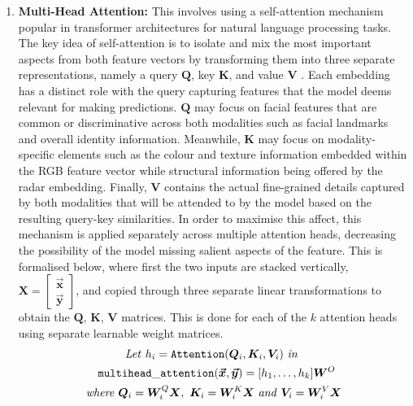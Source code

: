 \documentclass{mpaper}
\begin{document}
\begin{enumerate}
    \item \textbf{Multi-Head Attention:} This involves using a self-attention mechanism popular in transformer architectures for natural language processing tasks. The key idea of self-attention is to isolate and mix the most important aspects from both feature vectors by transforming them into three separate representations, namely a query $\bm{Q}$, key $\bm{K}$, and value $\bm{V}$ \cite{vaswani2017attention}. Each embedding has a distinct role with the query capturing features that the model deems relevant for making predictions. $\bm{Q}$ may focus on facial features that are common or discriminative across both modalities such as facial landmarks and overall identity information. Meanwhile, $\bm{K}$ may focus on modality-specific elements such as the colour and texture information embedded within the RGB feature vector while structural information being offered by the radar embedding. Finally, $\bm{V}$ contains the actual fine-grained details captured by both modalities that will be attended to by the model based on the resulting query-key similarities. In order to maximise this affect, this mechanism is applied separately across multiple attention heads, decreasing the possibility of the model missing salient aspects of the feature.
    This is formalised below, where first the two inputs are stacked vertically, $\bm{X} = \begin{bmatrix} \bm{\vec{x}} \\ \bm{\vec{y}} \end{bmatrix}$, and copied through three separate linear transformations to obtain the $\bm{Q}$, $\bm{K}$, $\bm{V}$ matrices. This is done for each of the $k$ attention heads using separate learnable weight matrices.
    \begin{align*}
        \mathit{Let} \ h_i = \mathtt{Attention}(\bm{Q}_i&, \bm{K}_i, \bm{V}_i) \ \mathit{in} \\
        \hspace{-1cm}\mathtt{multihead\_attention}(\bm{\vec{x}}, \bm{\vec{y}}) &= [h_1, \ldots, h_k]\bm{W}^O \\
        \mathit{where} \ 
        \bm{Q}_i = \bm{W}^{Q}_i\bm{X}, \ \bm{K}_i = \bm{W}^{K}_i&\bm{X} \ \mathit{and} \ \bm{V}_i = \bm{W}^{V}_i\bm{X}
    \end{align*}
\end{enumerate}
\end{document}
